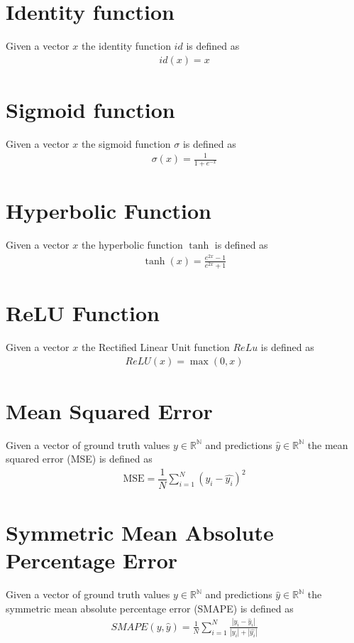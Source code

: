 \section{Identity function}
Given a vector $x$ the identity function $id$ is defined as 
\begin{gather}
    \label{identity}
    id(x) = x
\end{gather}

\section{Sigmoid function}
Given a vector $x$ the sigmoid function $\sigma$ is defined as 
\begin{gather}
    \label{sigmoid}
    \sigma(x) = \frac {1} {1 + e^{-x}}
\end{gather}

\section{Hyperbolic Function}
Given a vector $x$ the hyperbolic function $\tanh$ is defined as 
\begin{gather}
    \label{tanh}
    \tanh(x) = \frac {e^{2x} -1} {e^{2x} +1}
\end{gather}

\section{ReLU Function}
Given a vector $x$ the Rectified Linear Unit function $ReLu$ is defined as 
\begin{gather}
    \label{relu}
    ReLU(x) = \max(0, x)
\end{gather}

\section{Mean Squared Error}
Given a vector of ground truth values $y \in \mathbb{R^N}$ and predictions $\widehat{y} \in \mathbb{R^N}$ the mean squared error (MSE) is defined as 
\begin{gather}
\label{mse}
    \text{MSE}=
        \dfrac
            {1}
            {N}
            \sum\limits_{i=1}^{N}  (y_i - \hat{y_i})^2
\end{gather}

\section{Symmetric Mean Absolute Percentage Error}
Given a vector of ground truth values $y \in \mathbb{R^N}$ and predictions $\widehat{y} \in \mathbb{R^N}$ the symmetric mean absolute percentage error (SMAPE) is defined as 
\begin{equation}
  \begin{gathered} 
  \label{smape}
     SMAPE(y, \widehat{y}) = 
    \frac{1}{N} 
    \sum_{i=1}^{N}
    \frac{| y_{i} - \widehat{y}_{i} |} {|y_{i}| + |\widehat{y_{i}}|}  
  \end{gathered}
\end{equation}

